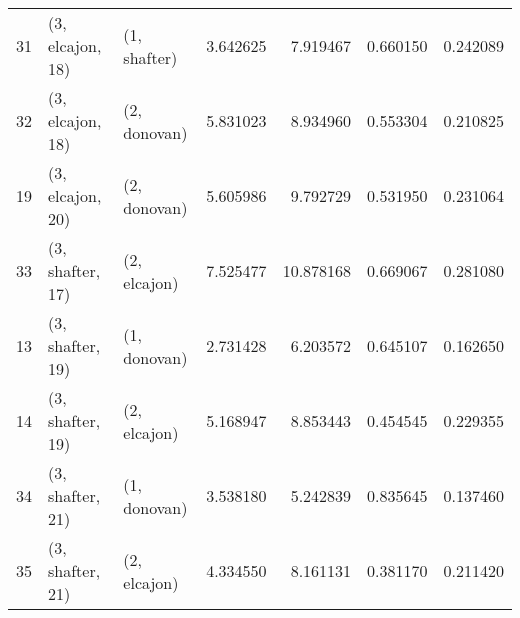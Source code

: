 \begin{tabular}{lllrrrr}
31 &  (3, elcajon, 18) &     (1, shafter) &   3.642625 &   7.919467 &   0.660150 &  0.242089 \\
32 &  (3, elcajon, 18) &     (2, donovan) &   5.831023 &   8.934960 &   0.553304 &  0.210825 \\
19 &  (3, elcajon, 20) &     (2, donovan) &   5.605986 &   9.792729 &   0.531950 &  0.231064 \\
33 &  (3, shafter, 17) &     (2, elcajon) &   7.525477 &  10.878168 &   0.669067 &  0.281080 \\
13 &  (3, shafter, 19) &     (1, donovan) &   2.731428 &   6.203572 &   0.645107 &  0.162650 \\
14 &  (3, shafter, 19) &     (2, elcajon) &   5.168947 &   8.853443 &   0.454545 &  0.229355 \\
34 &  (3, shafter, 21) &     (1, donovan) &   3.538180 &   5.242839 &   0.835645 &  0.137460 \\
35 &  (3, shafter, 21) &     (2, elcajon) &   4.334550 &   8.161131 &   0.381170 &  0.211420 \\
\bottomrule
\end{tabular}
